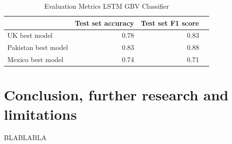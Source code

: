 \documentclass{article}
\begin{document}
{{\begin{table}[!htp]\centering
	\caption{Evaluation Metrics LSTM GBV Classifier}\label{tab: }
	\scriptsize
	\begin{tabular}{lrrr}\toprule
		&Test set accuracy &Test set F1 score \\\midrule
		UK best model &0.78 &0.83 \\
		Pakistan best model &0.83 &0.88 \\
		Mexico best model &0.74 &0.71 \\
		\bottomrule
	\end{tabular}
\end{table}
}

	
}
\newpage
\section{Conclusion, further research and limitations}{
BLABLABLA
}
\end{document}
